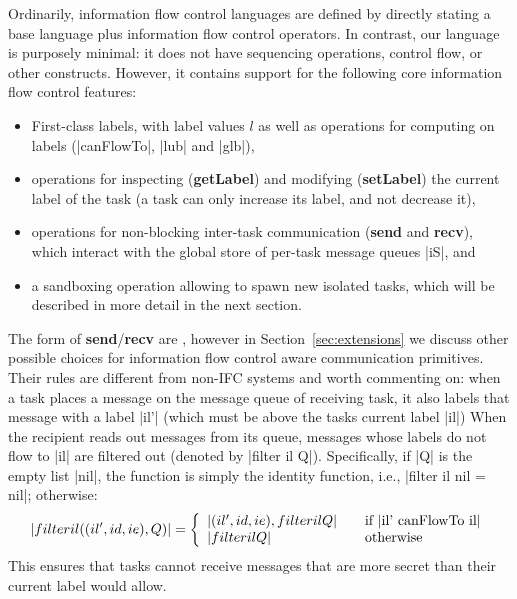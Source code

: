 Ordinarily, information flow control languages are defined by directly
stating a base language plus information flow control operators.  In
contrast, our language is purposely minimal: it does not have sequencing
operations, control flow, or other constructs.  However, it contains
support for the following core information flow control features:

\begin{itemize}
    \item First-class labels, with label values $l$ as well as operations for computing on
labels (|canFlowTo|, |lub| and |glb|),
    \item operations for inspecting (\textbf{getLabel}) and modifying (\textbf{setLabel}) the current label of the task (a task can only increase its label, and not decrease it),
    \item operations for non-blocking inter-task communication (\textbf{send} and \textbf{recv}),
        which interact with the global store of per-task message queues |iS|, and
    \item a sandboxing operation allowing to spawn new
    isolated tasks, which will be described in more detail in the
    next section.
\end{itemize}

The form of \textbf{send}/\textbf{recv} are  , however in Section~\ref{sec:extensions} we
discuss other possible choices for information flow control aware communication
primitives.  Their rules are different from non-IFC systems
and worth commenting on: when a task places
a message on the message queue of receiving task, it also labels that
message with a label |il'| (which must be above the tasks current label |il|)
When the recipient reads out messages from its queue,
messages whose labels do not
flow to |il| are filtered out (denoted by |filter il Q|).
Specifically, if |Q| is the empty list |nil|, the
function is simply the identity function, i.e.,
|filter il nil = nil|; otherwise:
\[
|filter il ((il', id, ie) , Q )| = \left\{
\begin{array}{l l}
|(il', id, ie) , filter il Q| & \quad \text{if |il' canFlowTo il|}\\
|filter il Q| & \quad \text{otherwise}
\end{array} \right.
\]
This ensures that tasks cannot receive messages that are more secret
than their current label would allow.


